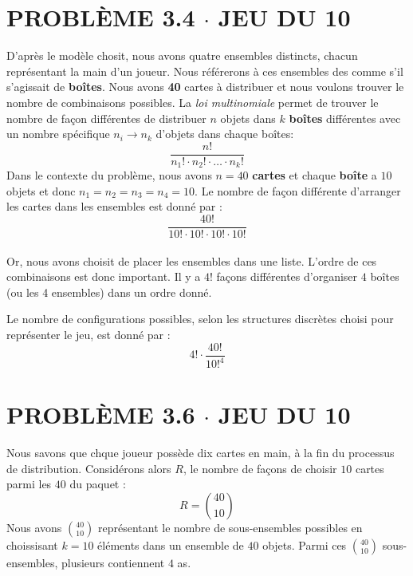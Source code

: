 \documentclass[8pt]{report}
\begin{document}
        \section*{\textnormal{PROBLÈME 3.4 \;\;\;\; $\cdot$ \;\;\;\; JEU DU 10 }} 
        \indent D'après le modèle chosit, nous avons quatre ensembles distincts, chacun représentant la main 
        d'un joueur. Nous référerons à ces ensembles des comme s'il s'agissait de  \textbf{boîtes}. Nous avons \textbf{40} cartes à distribuer 
        et nous voulons trouver le nombre de combinaisons possibles. La \textit{loi multinomiale} permet de trouver 
        le nombre de façon différentes de distribuer $n$ objets dans $k$ \textbf{boîtes} différentes avec un nombre  
        spécifique $n_i \to n_k$ d'objets dans chaque boîtes: 
        \[ \dfrac{n!}{n_1!\cdot n_2!\cdot\ldots\cdot n_k!} \]
        Dans le contexte du problème, nous avons $n = 40$ \textbf{cartes}  et chaque \textbf{boîte}  a $10$ 
        objets et donc $n_1 = n_2 = n_3 = n_4 = 10$. Le nombre de façon différente d'arranger les cartes dans les 
        ensembles est donné par : 
        \[ \dfrac{40!}{10!\cdot10!\cdot10!\cdot10!} \] 
        \\
        Or, nous avons choisit de placer les ensembles dans une liste. L'ordre de ces combinaisons est donc important. 
        Il y a $4!$ façons différentes d'organiser $4$ boîtes (ou les 4 ensembles) dans un ordre donné.

        \begin{Reponse}{}{}
        Le nombre de configurations 
        possibles, selon les structures discrètes choisi pour représenter le jeu, est donné par : 
        \[ 4! \cdot \dfrac{40!}{10!^4} \] 
        \end{Reponse}
        \section*{\textnormal{PROBLÈME 3.6 \;\;\;\; $\cdot$ \;\;\;\; JEU DU 10 }} 
        \indent Nous savons que chque joueur possède dix cartes en main, à la fin du processus de distribution. 
        Considérons alors $R$, le nombre de façons de choisir $10$ cartes parmi les $40$ du paquet : 
        \[  R = {40 \choose 10} \] 
        \indent Nous avons ${40 \choose 10}$ représentant le nombre de sous-ensembles possibles en choissisant $k = 10$ 
        éléments dans un ensemble de $40$ objets. Parmi ces ${40 \choose 10}$ sous-ensembles, plusieurs contiennent 
        $4$ as.         
        
\end{document}
